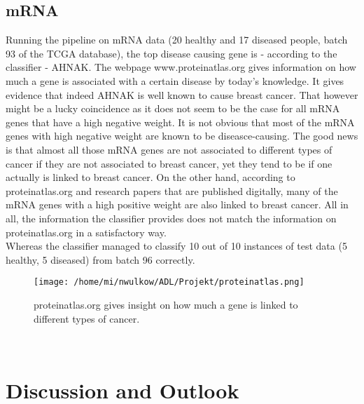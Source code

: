 \documentclass{bioinfo}
\begin{document}
\subsection{mRNA}
Running the pipeline on mRNA data (20 healthy and 17 diseased people, batch 93 of the TCGA database), the top disease causing gene is - according to the classifier - AHNAK. The webpage www.proteinatlas.org gives information on how much a gene is associated with a certain disease by today's knowledge. It gives evidence that indeed AHNAK is well known to cause breast cancer. That however might be a lucky coincidence as it does not seem to be the case for all mRNA genes that have a high negative weight. It is not obvious that most of the mRNA genes with high negative weight are known to be diseasce-causing. The good news is that almost all those mRNA genes are not associated to different types of cancer if they are not associated to breast cancer, yet they tend to be if one actually is linked to breast cancer. On the other hand, according to proteinatlas.org and research papers that are published digitally, many of the mRNA genes with a high positive weight are also linked to breast cancer. All in all, the information the classifier provides does not match the information on proteinatlas.org in a satisfactory way.\\
Whereas the classifier managed to classify 10 out of 10 instances of test data (5 healthy, 5 diseased) from batch 96 correctly.
\begin{figure}[!ht]
\centering
\texttt{[image: /home/mi/nwulkow/ADL/Projekt/proteinatlas.png]}
\caption{proteinatlas.org gives insight on how much a gene is linked to different types of cancer.}
\label{data_readin_matrix}
\end{figure}\\


\section{Discussion and Outlook}
\end{document}
